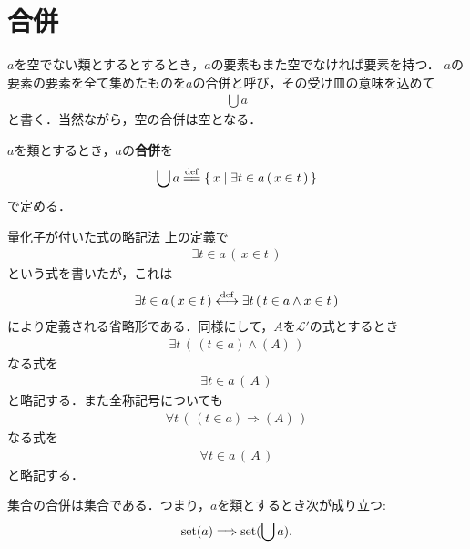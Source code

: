 \section{合併}
	$a$を空でない類とするとするとき，$a$の要素もまた空でなければ要素を持つ．
	$a$の要素の要素を全て集めたものを$a$の合併と呼び，その受け皿の意味を込めて
	\begin{align}
		\bigcup a
	\end{align}
	と書く．当然ながら，空の合併は空となる．
	
	\begin{screen}
		\begin{dfn}[合併]
			$a$を類とするとき，$a$の{\bf 合併}を
			\begin{align}
				\bigcup a \defeq \Set{x}{\exists t \in a\, (\, x \in t\, )}
				\label{eq:definition_of_union_1}
			\end{align}
			で定める．
		\end{dfn}
	\end{screen}
	
	\begin{itembox}[l]{量化子が付いた式の略記法}
		上の定義で
		\begin{align}
			\exists t \in a\, (\, x \in t\, )
		\end{align}
		という式を書いたが，これは
		\begin{align}
			\exists t \in a\, (\, x \in t\, ) \overset{\mathrm{def}}{\longleftrightarrow} \exists t\, (\, t \in a \wedge x \in t\, )
		\end{align}
		により定義される省略形である．同様にして，$A$を$\mathcal{L}'$の式とするとき
		\begin{align}
			\exists t\, \left(\, (t \in a) \wedge (A)\, \right)
		\end{align}
		なる式を
		\begin{align}
			\exists t \in a\, (\, A\, )
		\end{align}
		と略記する．また全称記号についても
		\begin{align}
			\forall t\, \left(\, (t \in a) \Longrightarrow (A)\, \right)
		\end{align}
		なる式を
		\begin{align}
			\forall t \in a\, (\, A\, )
		\end{align}
		と略記する．
	\end{itembox}
	
	\begin{screen}
		\begin{axm}[合併の公理]
			集合の合併は集合である．つまり，$a$を類とするとき次が成り立つ:
			\begin{align}
				\operatorname*{set} (a) \Longrightarrow \operatorname*{set} (\bigcup a).
			\end{align}
		\end{axm}
	\end{screen}
	
